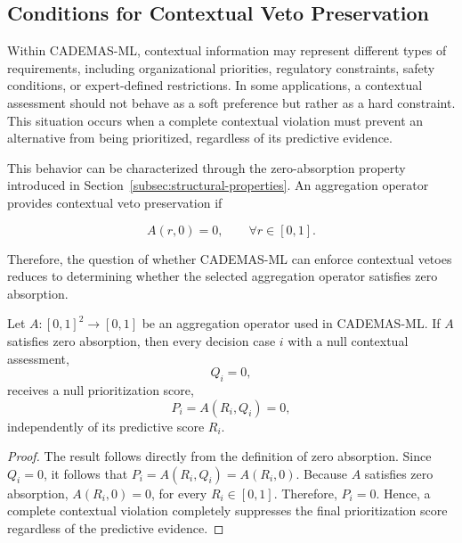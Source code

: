 \documentclass[mathematics,article,submit,moreauthors]{Definitions/mdpi}
\begin{document}
%
\subsection{Conditions for Contextual Veto Preservation}
\label{subsec:veto-preservation}

Within CADEMAS-ML, contextual information may represent different
types of requirements, including organizational priorities, regulatory
constraints, safety conditions, or expert-defined restrictions. In some
applications, a contextual assessment should not behave as a soft
preference but rather as a hard constraint. This situation occurs when a
complete contextual violation must prevent an alternative from being
prioritized, regardless of its predictive evidence.

This behavior can be characterized through the zero-absorption property
introduced in Section~\ref{subsec:structural-properties}. An aggregation
operator provides contextual veto preservation if

\begin{equation}
A(r,0)=0,\qquad \forall r\in[0,1].
\end{equation}

Therefore, the question of whether CADEMAS-ML can enforce contextual
vetoes reduces to determining whether the selected aggregation operator
satisfies zero absorption.

\begin{Theorem}
\label{thm:veto-preservation}
Let $A:[0,1]^2\rightarrow[0,1]$ be an aggregation operator used in
CADEMAS-ML. If $A$ satisfies zero absorption, then every decision case
$i$ with a null contextual assessment,
\begin{equation}
Q_i=0,
\end{equation}
receives a null prioritization score,
\begin{equation}
P_i=A(R_i,Q_i)=0,
\end{equation}
independently of its predictive score $R_i$.
\end{Theorem}

\begin{proof}
The result follows directly from the definition of zero absorption.
Since $Q_i=0$, {\color{teal}it follows that} $P_i=A(R_i,Q_i)=A(R_i,0)$.
Because $A$ satisfies zero absorption, $A(R_i,0)=0$, for every $R_i\in[0,1]$. Therefore, $P_i=0$.
Hence, a complete contextual violation completely suppresses the final
prioritization score regardless of the predictive evidence.
\end{proof}
\end{document}
